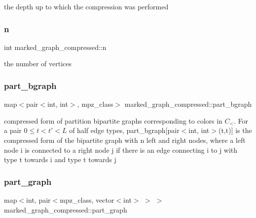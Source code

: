 the depth up to which the compression was performed 

\mbox{\label{classmarked__graph__compressed_a8d841016ddb11cfd33748c8deb6277ba}} 
\subsubsection{\texorpdfstring{n}{n}}
{\footnotesize\ttfamily int marked\+\_\+graph\+\_\+compressed\+::n}



the number of vertices 

\mbox{\label{classmarked__graph__compressed_a7b3267063fba30b45eb21b3ba4e07536}} 
\subsubsection{\texorpdfstring{part\+\_\+bgraph}{part\_bgraph}}
{\footnotesize\ttfamily map$<$pair$<$int, int$>$, mpz\+\_\+class$>$ marked\+\_\+graph\+\_\+compressed\+::part\+\_\+bgraph}



compressed form of partition bipartite graphs corresponding to colors in $C_<$. For a pair $0 \leq t < t' < L$ of half edge types, part\+\_\+bgraph\mbox{[}pair$<$int, int$>$(t,t\textquotesingle{})\mbox{]} is the compressed form of the bipartite graph with n left and right nodes, where a left node i is connected to a right node j if there is an edge connecting i to j with type t towards i and type t\textquotesingle{} towards j 

\mbox{\label{classmarked__graph__compressed_ae179a4737e6eab905c18a94d44ef64b7}} 
\subsubsection{\texorpdfstring{part\+\_\+graph}{part\_graph}}
{\footnotesize\ttfamily map$<$int, pair$<$mpz\+\_\+class, vector$<$int$>$ $>$ $>$ marked\+\_\+graph\+\_\+compressed\+::part\+\_\+graph}



